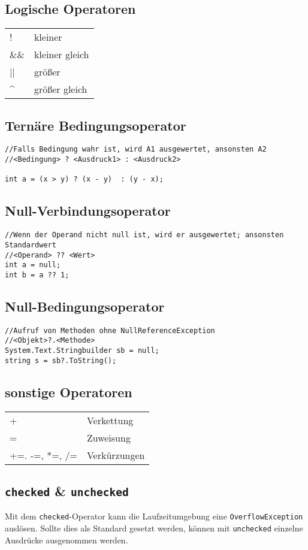 \subsection{Logische Operatoren}
\begin{tabular}{p{3cm}p{5cm}}
!	&kleiner\\
\&\&	&kleiner gleich\\
|| 	&größer\\
\^{}	&größer gleich\\
\end{tabular}
\subsection{Ternäre Bedingungsoperator}
\begin{lstlisting}
//Falls Bedingung wahr ist, wird A1 ausgewertet, ansonsten A2
//<Bedingung> ? <Ausdruck1> : <Ausdruck2>

int a = (x > y) ? (x - y)  : (y - x);

\end{lstlisting}
\subsection{Null-Verbindungsoperator}
\begin{lstlisting}
//Wenn der Operand nicht null ist, wird er ausgewertet; ansonsten Standardwert
//<Operand> ?? <Wert>
int a = null;
int b = a ?? 1;
\end{lstlisting}
\subsection{Null-Bedingungsoperator}
\begin{lstlisting}
//Aufruf von Methoden ohne NullReferenceException
//<Objekt>?.<Methode>
System.Text.Stringbuilder sb = null;
string s = sb?.ToString();
\end{lstlisting}
\subsection{sonstige Operatoren}
\begin{tabular}{p{3cm}p{5cm}}
+	&Verkettung\\
=	&Zuweisung\\
+=. -=, *=, /= 	&Verkürzungen\\
\end{tabular}
\subsection{\texttt{checked} \& \texttt{unchecked}}
Mit dem \texttt{checked}-Operator kann die Laufzeitumgebung eine \texttt{OverflowException} auslösen. Sollte dies als Standard gesetzt werden, können mit \texttt{unchecked} einzelne Ausdrücke ausgenommen werden.
